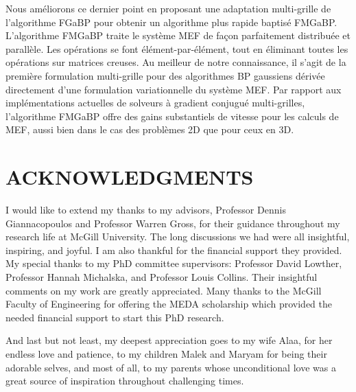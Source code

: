 \documentclass [12pt,letterpaper]{report}
\begin{document}
Nous am\'eliorons ce dernier point en proposant une adaptation multi-grille de l'algorithme FGaBP pour obtenir un algorithme plus rapide baptis\'e FMGaBP.
L'algorithme FMGaBP traite le syst\`eme MEF de fa\c{c}on parfaitement distribu\'ee et parall\`ele.
Les op\'erations se font \'el\'ement-par-\'el\'ement, tout en \'eliminant toutes les op\'erations sur matrices creuses.
Au meilleur de notre connaissance, il s'agit de la premi\`ere formulation multi-grille pour des algorithmes BP gaussiens d\'eriv\'ee directement d'une formulation variationnelle du syst\`eme MEF.
Par rapport aux impl\'ementations actuelles de solveurs \`a gradient conjugu\'e multi-grilles, l'algorithme FMGaBP offre des gains substantiels de vitesse pour les calculs de MEF, aussi bien dans le cas des probl\`emes 2D que pour ceux en 3D.
\newpage

\section*{\centering \MakeUppercase{Acknowledgments}}

I would like to extend my thanks to my advisors, Professor Dennis Giannacopoulos and Professor Warren Gross, for their guidance throughout my research life at McGill University.
The long discussions we had were all insightful, inspiring, and joyful.
I am also thankful for the financial support they provided.
My special thanks to my PhD committee supervisors: Professor David Lowther, Professor Hannah Michalska, and Professor Louis Collins.
Their insightful comments on my work are greatly appreciated.
Many thanks to the McGill Faculty of Engineering for offering the MEDA scholarship which provided the needed financial support to start this PhD research.


And last but not least, my deepest appreciation goes to my wife Alaa, for her endless love and patience, to my children Malek and Maryam for being their adorable selves, and most of all, to my parents whose unconditional love was a great source of inspiration throughout challenging times.
\tableofcontents
\listoffigures
\listoftables

\begin{singlespace}
	\setlength{\glsdescwidth}{0.7\linewidth}
	\renewcommand*{\arraystretch}{0.9}
	\printnoidxglossary[type=\acronymtype,style=long,title=List of Acronyms,nonumberlist]
	\renewcommand*{\arraystretch}{1}
\end{singlespace}
\newpage
%
\cleardoublepage
{}
\end{document}

